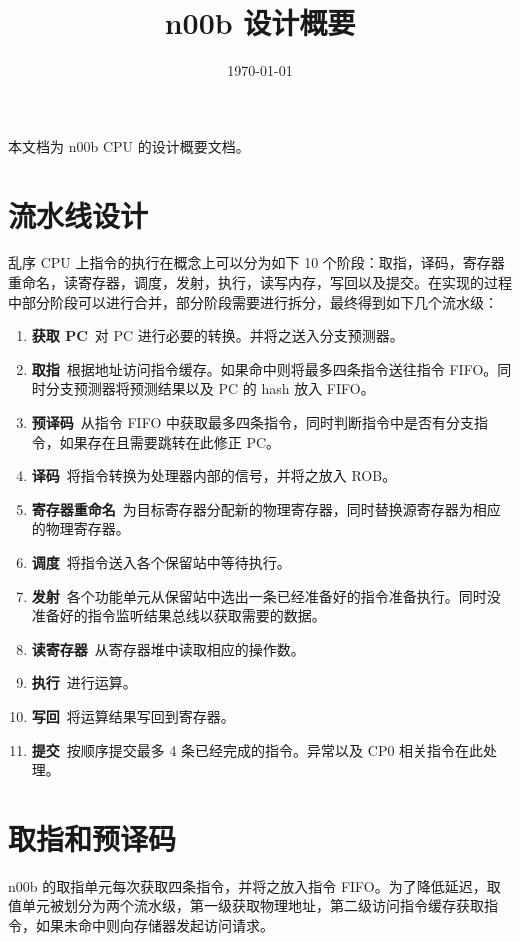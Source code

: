 \documentclass[blue,normal,cn]{elegantnote}
\title{n00b 设计概要}
\date{\today}
\begin{document}
\maketitle
	
本文档为 n00b CPU 的设计概要文档。

\section{流水线设计}

乱序 CPU 上指令的执行在概念上可以分为如下 10 个阶段：取指，译码，寄存器重命名，读寄存器，调度，发射，执行，读写内存，写回以及提交。在实现的过程中部分阶段可以进行合并，部分阶段需要进行拆分，最终得到如下几个流水级：
\begin{enumerate}
	\item \textbf{获取 PC}\ 对 PC 进行必要的转换。并将之送入分支预测器。
	\item \textbf{取指}\ 根据地址访问指令缓存。如果命中则将最多四条指令送往指令 FIFO。同时分支预测器将预测结果以及 PC 的 hash 放入 FIFO。
	\item \textbf{预译码}\ 从指令 FIFO 中获取最多四条指令，同时判断指令中是否有分支指令，如果存在且需要跳转在此修正 PC。
	\item \textbf{译码}\ 将指令转换为处理器内部的信号，并将之放入 ROB。
	\item \textbf{寄存器重命名}\ 为目标寄存器分配新的物理寄存器，同时替换源寄存器为相应的物理寄存器。
	\item \textbf{调度}\ 将指令送入各个保留站中等待执行。
	\item \textbf{发射}\ 各个功能单元从保留站中选出一条已经准备好的指令准备执行。同时没准备好的指令监听结果总线以获取需要的数据。
	\item \textbf{读寄存器}\ 从寄存器堆中读取相应的操作数。
	\item \textbf{执行}\ 进行运算。
	\item \textbf{写回}\ 将运算结果写回到寄存器。
	\item \textbf{提交}\ 按顺序提交最多 4 条已经完成的指令。异常以及 CP0 相关指令在此处理。
\end{enumerate}

\section{取指和预译码}
n00b 的取指单元每次获取四条指令，并将之放入指令 FIFO。为了降低延迟，取值单元被划分为两个流水级，第一级获取物理地址，第二级访问指令缓存获取指令，如果未命中则向存储器发起访问请求。
\end{document}
